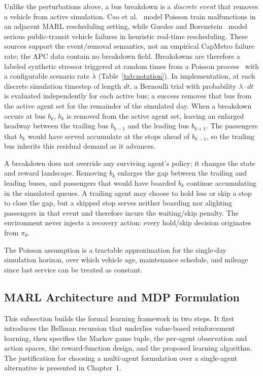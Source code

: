 Unlike the perturbations above, a bus breakdown is a \textit{discrete event} that removes a vehicle from active simulation. Cao et al.~\cite{Cao2022Train} model Poisson train malfunctions in an adjacent MARL rescheduling setting, while Guedes and Borenstein~\cite{Guedes2018Rescheduling} model serious public-transit vehicle failures in heuristic real-time rescheduling. These sources support the event/removal semantics, not an empirical CapMetro failure rate; the APC data contain no breakdown field. Breakdowns are therefore a labeled synthetic stressor triggered at random times from a Poisson process~\cite{Kingman1993Poisson} with a configurable scenario rate $\lambda$ (Table~\ref{tab:notation}). In implementation, at each discrete simulation timestep of length $dt$, a Bernoulli trial with probability $\lambda \cdot dt$ is evaluated independently for each active bus; a success removes that bus from the active agent set for the remainder of the simulated day. When a breakdown occurs at bus $b_k$, $b_k$ is removed from the active agent set, leaving an enlarged headway between the trailing bus $b_{k-1}$ and the leading bus $b_{k+1}$. The passengers that $b_k$ would have served accumulate at the stops ahead of $b_{k-1}$, so the trailing bus inherits this residual demand as it advances.

A breakdown does not override any surviving agent's policy; it changes the state and reward landscape. Removing $b_k$ enlarges the gap between the trailing and leading buses, and passengers that would have boarded $b_k$ continue accumulating in the simulated queues. A trailing agent may choose to hold less or skip a stop to close the gap, but a skipped stop serves neither boarding nor alighting passengers in that event and therefore incurs the waiting/skip penalty. The environment never injects a recovery action: every hold/skip decision originates from $\pi_\theta$.

The Poisson assumption is a tractable approximation for the single-day simulation horizon, over which vehicle age, maintenance schedule, and mileage since last service can be treated as constant.


\subsection{MARL Architecture and MDP Formulation}\label{subsec:marl-arch}

This subsection builds the formal learning framework in two steps. It first introduces the Bellman recursion that underlies value-based reinforcement learning, then specifies the Markov game tuple, the per-agent observation and action spaces, the reward-function design, and the proposed learning algorithm. The justification for choosing a multi-agent formulation over a single-agent alternative is presented in Chapter~1.

